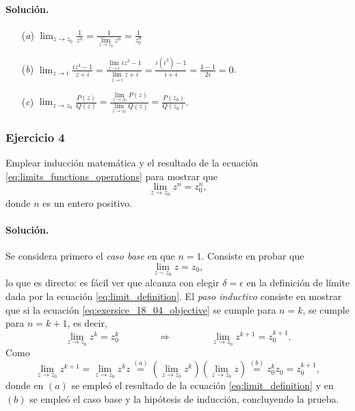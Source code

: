 \documentclass[a4paper]{report}
\begin{document}
\paragraph{Solución.} 

\begin{enumerate}
 \item[(\textit{a})] 
 \(\displaystyle\lim_{z\to z_0}\frac{1}{z^n}=\frac{1}{\lim\limits_{z\to z_0}z^n}=\frac{1}{z_0^n}\)
 \item[(\textit{b})] 
 \(\displaystyle\lim_{z\to i}\frac{iz^3-1}{z+i}=\frac{\lim\limits_{z\to i}iz^3-1}{\lim\limits_{z\to i}z+i}=\frac{i(i^3)-1}{i+i}=\frac{1-1}{2i}=0\).
 \item[(\textit{c})]
 \(\displaystyle\lim_{z\to z_0}\frac{P(z)}{Q(z)}=\frac{\lim\limits_{z\to z_0}P(z)}{\lim\limits_{z\to z_0}Q(z)}=\frac{P(z_0)}{Q(z_0)}\).
\end{enumerate}

\subsubsection{Ejercicio 4}

Emplear inducción matemática y el resultado de la ecuación \ref{eq:limits_functions_operations} para mostrar que
\begin{equation}\label{eq:exersice_18_04_objective}
 \lim_{z\to z_0}z^n=z_0^n,
\end{equation}
donde \(n\) es un entero positivo.

\paragraph{Solución.} Se considera primero el \emph{caso base} en que \(n=1\). Consiste en probar que 
\[
 \lim_{z-z_0}z=z_0,
\]
lo que es directo: es fácil ver que alcanza con elegir \(\delta=\epsilon\) en la definición de límite dada por la ecuación \ref{eq:limit_definition}. El \emph{paso inductivo} consiste en mostrar que si la ecuación \ref{eq:exersice_18_04_objective} se cumple para \(n=k\), se cumple para \(n=k+1\), es decir,
\[
 \lim_{z\to z_0}z^k=z_0^k
 \qquad\qquad\Rightarrow\qquad\qquad
 \lim_{z\to z_0}z^{k+1}=z_0^{k+1}.
\] 
Como
\[
 \lim_{z\to z_0}z^{k+1}=\lim_{z\to z_0}z^kz\overset{(a)}{=}\left(\lim_{z\to z_0}z^k\right)\left(\lim_{z\to z_0}z\right)\overset{(b)}{=}z_0^kz_0=z_0^{k+1},
\]
donde en \((a)\) se empleó el resultado de la ecuación \ref{eq:limit_definition} y en \((b)\) se empleó el caso base y la hipótesis de inducción, concluyendo la prueba.
\end{document}
